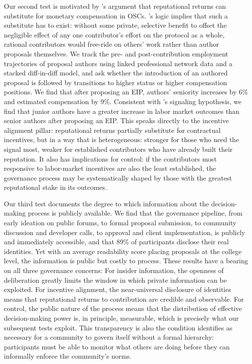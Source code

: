 \documentclass[No]{AEA}
\begin{document}
Our second test is motivated by \cite{LernerTirole2005}'s argument that reputational returns can substitute for monetary compensation in OSCs. \cite{Olson1965}'s logic implies that such a substitute has to exist: without some private, selective benefit to offset the negligible effect of any one contributor's effort on the protocol as a whole, rational contributors would free-ride on others' work rather than author proposals themselves. We track the pre- and post-contribution employment trajectories of proposal authors using linked professional network data and a stacked diff-in-diff model, and ask whether the introduction of an authored proposal is followed by transitions to higher status or higher compensation positions. We find that after proposing an EIP, authors' seniority increases by 6\% and estimated compensation by 9\%. Consistent with \cite{LernerTirole2002}'s signaling hypothesis, we find that junior authors have a greater increase in labor market outcomes than senior authors after proposing an EIP. This speaks directly to the incentive alignment pillar: reputational returns partially substitute for contractual incentives, but in a way that is heterogeneous: stronger for those who need the signal most, weaker for established contributors who have already built their reputation. It also has implications for control: if the contributors most responsive to labor-market incentives are also the least established, the governance process may be systematically shaped by those with the greatest reputational stake in its outcomes.

Our third test documents the degree to which information about the decision-making process is publicly available. We find that the governance pipeline, from early ideation on public forums, to formal proposal submission, to community discussion and developer calls, to approval and client implementation, is publicly and immediately accessible, and that 89\% of participants disclose their real identities. Yet with an average readability score placing proposals at the college level, the information is public but costly to process. These results have a bearing on all three governance concerns: For insider information, the openness of deliberation greatly limits the window in which private information can be exploited. For incentive alignment, the near-universal disclosure of identities means that reputational returns to contribution are credible and observable. For control, the public nature of the process means that the distribution of effective decision-making power is, in principle, measurable, which is precisely what our subsequent tests exploit. This transparency is also the condition \cite{Ostrom1990} identifies as necessary for a community to govern itself without a formal hierarchy: participants must be able to monitor what others are doing before they can informally enforce the community's norms.
\end{document}
